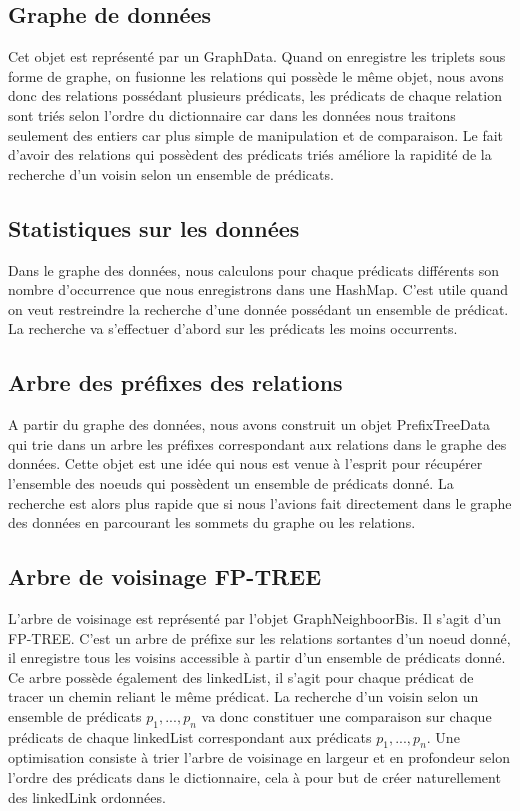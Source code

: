 \documentclass[12pt]{report}
\begin{document}
\subsection{Graphe de données}

Cet objet est représenté par un GraphData. Quand on enregistre les triplets sous forme de graphe, on fusionne les relations qui possède le même objet, nous avons donc des relations possédant plusieurs prédicats, les prédicats de chaque relation sont triés selon l'ordre du dictionnaire car dans les données nous traitons seulement des entiers car plus simple de manipulation et de comparaison. Le fait d'avoir des relations qui possèdent des prédicats triés améliore la rapidité de la recherche d'un voisin selon un ensemble de prédicats.

\subsection{Statistiques sur les données}

Dans le graphe des données, nous calculons pour chaque prédicats différents son nombre d'occurrence que nous enregistrons dans une HashMap. C'est utile quand on veut restreindre la recherche d'une donnée possédant un ensemble de prédicat. La recherche va s'effectuer d'abord sur les prédicats les moins occurrents.

\subsection{Arbre des préfixes des relations}

A partir du graphe des données, nous avons construit un objet PrefixTreeData qui trie dans un arbre les préfixes correspondant aux relations dans le graphe des données. Cette objet est une idée qui nous est venue à l'esprit pour récupérer l'ensemble des noeuds qui possèdent un ensemble de prédicats donné. La recherche est alors plus rapide que si nous l'avions fait directement dans le graphe des données en parcourant les sommets du graphe ou les relations.

\subsection{Arbre de voisinage FP-TREE}

L'arbre de voisinage est représenté par l'objet GraphNeighboorBis. Il s'agit d'un FP-TREE. C'est un arbre de préfixe sur les relations sortantes d'un noeud donné, il enregistre tous les voisins accessible à partir d'un ensemble de prédicats donné. Ce arbre possède également des linkedList, il s'agit pour chaque prédicat de tracer un chemin reliant le même prédicat. La recherche d'un voisin selon un ensemble de prédicats $p_{1},...,p_{n}$ va donc constituer une comparaison sur chaque prédicats de chaque linkedList correspondant aux prédicats $p_{1},...,p_{n}$. Une optimisation consiste à trier l'arbre de voisinage en largeur et en profondeur selon l'ordre des prédicats dans le dictionnaire, cela à pour but de créer naturellement des linkedLink ordonnées.
\end{document}
